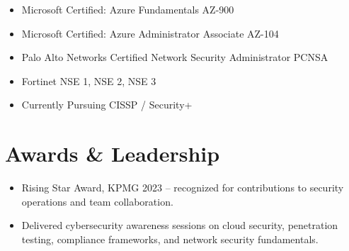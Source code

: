 \documentclass[11pt,a4paper]{article}
\begin{document}
\begin{itemize}[leftmargin=*]
\item Microsoft Certified: Azure Fundamentals AZ-900
\item Microsoft Certified: Azure Administrator Associate AZ-104
\item Palo Alto Networks Certified Network Security Administrator PCNSA
\item Fortinet NSE 1, NSE 2, NSE 3
\item Currently Pursuing CISSP / Security+
\end{itemize}

\section*{Awards \& Leadership}

\begin{itemize}[leftmargin=*]
\item Rising Star Award, KPMG 2023 -- recognized for contributions to security operations and team collaboration.

\item Delivered cybersecurity awareness sessions on cloud security, penetration testing, compliance frameworks, and network security fundamentals.
\end{itemize}
\end{document}
